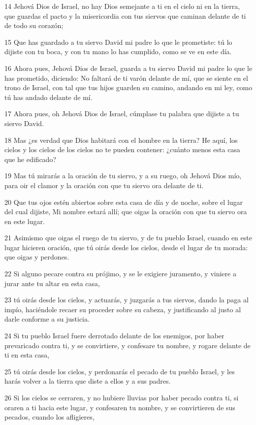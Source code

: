 \par 14 Jehová Dios de Israel, no hay Dios semejante  a  ti en el cielo ni en la tierra, que guardas el pacto y la misericordia con tus siervos que caminan delante de ti de todo su corazón;
\par 15 Que has guardado  a  tu siervo David mi padre lo que le prometiste: tú lo dijiste con tu boca, y con tu mano lo has cumplido, como se ve en este día.
\par 16 Ahora pues, Jehová Dios de Israel, guarda  a  tu siervo David mi padre lo que le has prometido, diciendo: No faltará de ti varón delante de mí, que se siente en el trono de Israel,  con tal que tus hijos guarden su camino, andando en mi ley, como tú has andado delante de mí. 
\par 17 Ahora pues, oh Jehová Dios de Israel, cúmplase tu palabra que dijiste  a  tu siervo David.
\par 18 Mas ¿es verdad que Dios habitará con el hombre en la tierra? He aquí, los cielos y los cielos de los cielos no te pueden contener: ¿cuánto menos esta casa que he edificado? 
\par 19 Mas tú mirarás  a  la oración de tu siervo, y  a  su ruego, oh Jehová Dios mío, para oir el clamor y la oración con que tu siervo ora delante de ti.
\par 20 Que tus ojos estén abiertos sobre esta casa de día y de noche, sobre el lugar del cual dijiste, Mi nombre estará allí; que oigas la oración con que tu siervo ora en este lugar.
\par 21 Asimismo que oigas el ruego de tu siervo, y de tu pueblo Israel, cuando en este lugar hicieren oración, que tú oirás desde los cielos, desde el lugar de tu morada: que oigas y perdones.
\par 22 Si alguno pecare contra su prójimo, y se le exigiere juramento, y viniere a jurar ante tu  altar en esta casa,
\par 23 tú oirás desde los cielos, y actuarás, y juzgarás  a  tus siervos, dando la paga al impío, haciéndole recaer su proceder sobre su cabeza, y justificando al justo al darle conforme a su justicia.
\par 24 Si tu pueblo Israel fuere derrotado delante de los enemigos, por haber prevaricado contra ti, y se convirtiere, y confesare tu nombre, y rogare delante de ti en esta casa,
\par 25 tú oirás desde los cielos, y perdonarás el pecado de tu pueblo Israel, y les harás volver a la tierra que diste a ellos y a sus padres.
\par 26 Si los cielos se cerraren, y no hubiere lluvias por haber pecado contra ti, si oraren a ti hacia este lugar, y confesaren tu nombre, y se convirtieren de sus pecados, cuando los afligieres,
